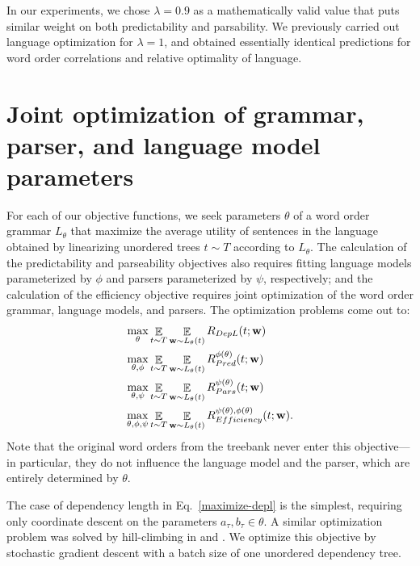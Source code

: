 \documentclass[12pt]{article}
\DeclareMathOperator{\E}{\mathop{\mathbb{E}}}
\begin{document}
In our experiments, we chose $\lambda = 0.9$ as a mathematically valid value that puts similar weight on both predictability and parsability.
We previously carried out language optimization for $\lambda = 1$, and obtained essentially identical predictions for word order     correlations and relative optimality of language.


\section{Joint optimization of grammar, parser, and language model parameters}

For each of our objective functions, we seek parameters $\theta$ of a word order grammar $L_\theta$ that maximize the average utility of sentences in the language obtained by linearizing unordered trees $t \sim T$ according to $L_\theta$. The calculation of the predictability and parseability objectives also requires fitting language models parameterized by $\phi$ and parsers parameterized by $\psi$, respectively; and the calculation of the efficiency objective requires joint optimization of the word order grammar, language models, and parsers. The optimization problems come out to:
\begin{align}
\max_\theta &\E_{t \sim T}\E_{{\bf w} \sim L_\theta(t)} R_{DepL}(t; {\bf w}) \label{eq:maximize-depl}\\
\max_{\theta,\phi} &\E_{t \sim T}\E_{{\bf w} \sim L_\theta(t)} R_{Pred}^{\phi(\theta)}(t; {\bf w}) \label{eq:maximize-pred}\\
\max_{\theta,\psi} &\E_{t \sim T}\E_{{\bf w} \sim L_\theta(t)} R_{Pars}^{\psi(\theta)}(t; {\bf w}) \label{Eq:maximize-pars} \\
\max_{\theta,\phi,\psi} &\E_{t \sim T}\E_{{\bf w} \sim L_\theta(t)} R_{Efficiency}^{\psi(\theta), \phi(\theta)}(t; {\bf w}). \label{eq:maximize-efficiency} 
\end{align}
Note that the original word orders from the treebank never enter this objective---in particular, they do not influence the language model and the parser, which are entirely determined by $\theta$.

The case of dependency length in Eq.~\ref{maximize-depl} is the simplest, requiring only coordinate descent on the parameters $a_\tau, b_\tau \in \theta$. A similar optimization problem was solved by hill-climbing in \citet{gildea2007optimizing} and \citet{gildea2015human}.
We optimize this objective by stochastic gradient descent with a batch size of one unordered dependency tree.
\end{document}
